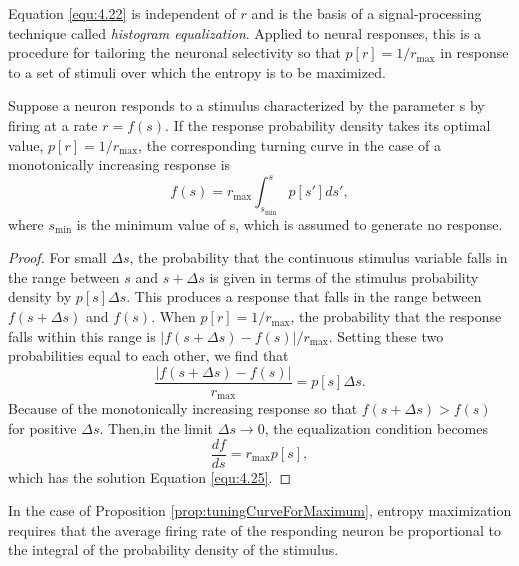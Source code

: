 \begin{rem}
  Equation \ref{equ:4.22} is independent of $r$ and is the basis of a signal-processing technique called \emph{histogram equalization}. Applied to neural responses, this is a procedure for tailoring the neuronal selectivity so that $p[r]=1/r_{{\max}}$ in response to a set of stimuli over which the entropy is to be maximized.
\end{rem}
\begin{prop}
  \label{prop:tuningCurveForMaximum}
  Suppose a neuron responds to a stimulus characterized by the parameter s by firing at a rate $r=f(s)$. If the response probability density takes its optimal value, $p[r] = 1/r_{\max}$, the corresponding turning curve in the case of a monotonically increasing response is
  \begin{equation}
    \label{equ:4.25}
    f(s)=r_{{\max}}\int_{s_{\min}}^sp[s']ds',
  \end{equation}
  where $s_{\min}$ is the minimum value of s, which is assumed to generate no response.
  \begin{proof}
    For small $\Delta s$, the probability that the continuous stimulus variable falls in the range between $s$ and $s+\Delta s$ is given in terms of the stimulus probability density by $p[s]\Delta s$. This produces a response that falls in the range between $f(s+\Delta s)$ and $f(s)$. When $p[r]=1/r_{{\max}}$, the probability that the response falls within this range is $|f(s+\Delta s)-f(s)|/r_{{\max}}$. Setting these two probabilities equal to each other, we find that
    \begin{equation}
      \label{equ:equal probability}
      \frac{|f(s+\Delta s)-f(s)|}{r_{{\max}}}=p[s]\Delta s.
    \end{equation}
    Because of the monotonically increasing response so that $f(s+\Delta s)>f(s)$ for positive $\Delta s$. Then,in the limit $\Delta s\rightarrow 0$, the equalization condition becomes
    \begin{equation}
      \frac{df}{ds}=r_{{\max}}p[s],
    \end{equation}
    which has the solution Equation \ref{equ:4.25}.
  \end{proof}
\end{prop}
\begin{rem}
  In the case of Proposition \ref{prop:tuningCurveForMaximum}, entropy maximization requires that the average firing rate of the responding neuron be proportional to the integral of the probability density of the stimulus.
\end{rem}

